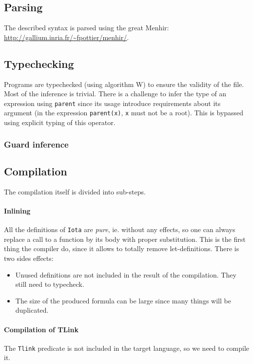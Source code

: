 \documentclass[10pt,a4paper]{article}
\newcommand{\ocaml}{\texttt}
\begin{document}
\subsection{Parsing}
The described syntax is parsed using the great Menhir: \url{http://gallium.inria.fr/~fpottier/menhir/}.

\subsection{Typechecking}
Programs are typechecked (using algorithm W) to ensure the validity of the file. Most of the inference is trivial. There is a challenge to infer the type of an expression using \ocaml{parent} since its usage introduce requirements about its argument (in the expression \ocaml{parent(x)}, \ocaml{x} must not be a root). This is bypassed using explicit typing of this operator.

\subsubsection{Guard inference}

\subsection{Compilation}
The compilation itself is divided into sub-steps.

\paragraph{Inlining}
All the definitions of \verb|Iota| are \emph{pure}, ie. without any effects, so one can always replace a call to a function by its body with proper substitution. This is the first thing the compiler do, since it allows to totally remove let-definitions. There is two sides effects:

\begin{itemize}
\item Unused definitions are not included in the result of the compilation. They still need to typecheck.
\item The size of the produced formula can be large since many things will be duplicated.
\end{itemize}

\paragraph{Compilation of TLink}
The \ocaml{Tlink} predicate is not included in the target language, so we need to compile it.
\end{document}
